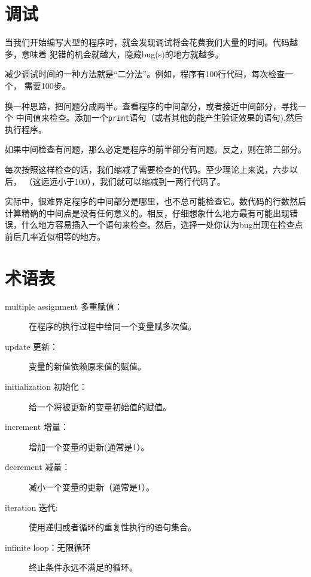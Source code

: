 \section{调试}

当我们开始编写大型的程序时，就会发现调试将会花费我们大量的时间。代码越多，意味着
犯错的机会就越大，隐藏bug(s)的地方就越多。


减少调试时间的一种方法就是“二分法”。例如，程序有100行代码，每次检查一个，
需要100步。

换一种思路，把问题分成两半。查看程序的中间部分，或者接近中间部分，寻找一个
中间值来检查。添加一个{\tt print}语句（或者其他的能产生验证效果的语句),然后执行程序。

如果中间检查有问题，那么必定是程序的前半部分有问题。反之，则在第二部分。

每次按照这样检查的话，我们缩减了需要检查的代码。至少理论上来说，六步以后，
（这远远小于100），我们就可以缩减到一两行代码了。

实际中，很难界定程序的中间部分是哪里，也不总可能检查它。数代码的行数然后计算精确的中间点是没有任何意义的。相反，仔细想象什么地方最有可能出现错误，什么地方容易插入一个语句来检查。然后，选择一处你认为bug出现在检查点前后几率近似相等的地方。

\section{术语表}

\begin{description}

\item [multiple assignment 多重赋值：] 在程序的执行过程中给同一个变量赋多次值。

\item [update 更新：] 变量的新值依赖原来值的赋值。

\item [initialization 初始化：]给一个将被更新的变量初始值的赋值。

\item [increment 增量：] 增加一个变量的更新(通常是1）。

\item [decrement 减量：]减小一个变量的更新（通常是1）。

\item [iteration 迭代:]使用递归或者循环的重复性执行的语句集合。

\item [infinite loop：无限循环]终止条件永远不满足的循环。

\end{description}



